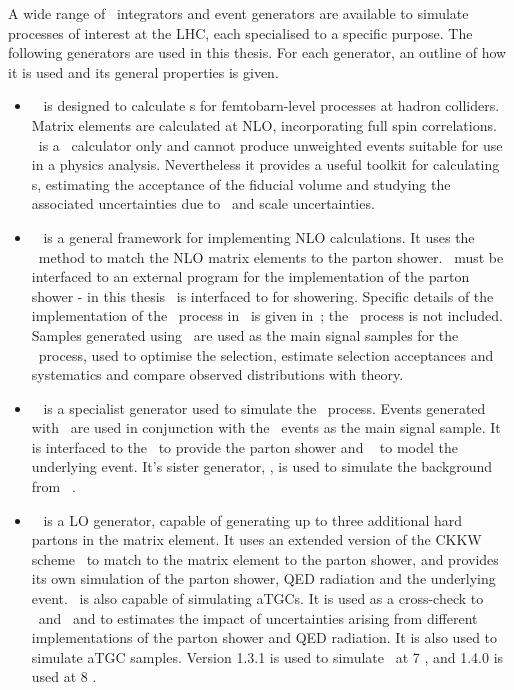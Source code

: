 A wide range of \mc\ integrators and event generators are available to simulate
processes of interest at the LHC, each specialised to a specific purpose. The
following generators are used in this thesis. For each generator, an outline of
how it is used and its general properties is given.

\begin{itemize}
    \item \mcfm ~\cite{Campbell:2011} is designed to calculate \cx s for
    femtobarn-level processes at hadron colliders. Matrix elements are
    calculated at NLO, incorporating full spin correlations. \mcfm\ is a \cx\
    calculator only and cannot produce unweighted events suitable for use in a
    physics analysis. Nevertheless it provides a useful toolkit for calculating
    \cx s, estimating the acceptance of the fiducial volume and studying the
    associated uncertainties due to \partDF\ and scale uncertainties.

    \item \powhegbox~\cite{Alioli:2010xd} is a general framework for implementing
    NLO calculations. It uses the \powheg\ method to match the NLO matrix
    elements to the parton shower. \powhegbox\ must be interfaced to an external
    program for the implementation of the parton shower - in this thesis
    \powhegbox\ is interfaced to \pythia for showering. Specific details of the
    implementation of the \ZZ\ process in \powhegbox\ is given
    in~\cite{Melia:2011tj}; the \ggZZ\ process is not included. 
    Samples generated using \powhegbox\ are used as the main signal samples for
    the \qqZZ\ process, used to optimise the selection, estimate selection
    acceptances and systematics and compare observed distributions with theory.

    \item \ggtwoZZ~\cite{gg2ZZ} is a specialist generator used to simulate the
    \ggZZ\ process. Events generated with \ggtwoZZ\ are used in conjunction with
    the \powhegbox\ events as the main signal sample. It is interfaced to the
    \herwig\ to provide the parton shower and \jimmy~\cite{bib:jimmy} to model the underlying
    event. It's sister generator, \ggtwoWW, is used to simulate the background
    from \ggZZ~\cite{Binoth:2006mf}.

    \item \sherpa~\cite{Gleisberg:2008ta} is a LO generator, capable of
    generating up to three additional hard partons in the matrix element. It
    uses an extended version of the CKKW scheme~\cite{Hoeche:2009rj} to match to the matrix element to the parton shower,
    and provides its own simulation of the parton shower, QED radiation and
    the underlying event. \sherpa\ is also capable of simulating aTGCs. It is
    used as a cross-check to \powhegbox\ and \ggZZ\ and to estimates the impact
    of uncertainties
    arising from different implementations of the parton shower and QED
    radiation. It is also used to simulate aTGC samples.
    Version 1.3.1 is used to simulate \qqZZllll\ at 7 \tev, and 1.4.0 is used at
    8 \tev.


\end{itemize}
